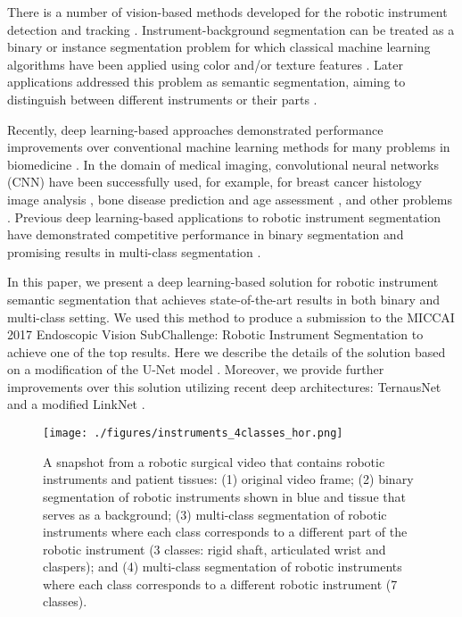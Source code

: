 \documentclass[runningheads,a4paper]{llncs}[2015/06/24]
\begin{document}
There is a number of vision-based methods developed for the robotic instrument detection and tracking \cite{munzer2018content}. Instrument-background segmentation can be treated as a binary or instance segmentation problem for which classical machine learning algorithms have been applied using color and/or texture features  \cite{speidel2006tracking, doignon2007segmentation}. Later applications addressed this problem as semantic segmentation, aiming to distinguish between different instruments or their parts \cite{pezzementi2009articulated, bouget2015detecting}.

Recently, deep learning-based approaches demonstrated performance improvements over conventional machine learning methods for many problems in biomedicine \cite{ching2017opportunities, kalinin2018deep}. In the domain of medical imaging, convolutional neural networks (CNN) have been successfully used, for example, for breast cancer histology image analysis \cite{rakhlin2018deep}, bone disease prediction \cite{tiulpin2018automatic} and age assessment \cite{iglovikov2017pediatric}, and other problems \cite{ching2017opportunities}. Previous deep learning-based applications to robotic instrument segmentation have demonstrated competitive performance in binary segmentation \cite{garcia2017toolnet, attia2017surgical} and promising results in multi-class segmentation \cite{pakhomov2017deep}.

In this paper, we present a deep learning-based solution for robotic instrument semantic segmentation that achieves state-of-the-art results in both binary and multi-class setting. We used this method to produce a submission to the MICCAI 2017 Endoscopic Vision SubChallenge: Robotic Instrument Segmentation \cite{miccai2017} to achieve one of the top results. Here we describe the details of the solution based on a modification of the U-Net model \cite{ronneberger2015u, iglovikov2017satellite}. Moreover, we provide further improvements over this solution utilizing recent deep architectures: TernausNet \cite{iglovikov2018ternausnet} and a modified LinkNet \cite{chaurasia2017linknet}.

\begin{figure}[!t]
\centering
\texttt{[image: ./figures/instruments\_4classes\_hor.png]}
\caption{A snapshot from a robotic surgical video that contains robotic instruments and patient tissues: (1) original video frame; (2) binary segmentation of robotic instruments shown in blue and tissue that serves as a background; (3) multi-class segmentation of robotic instruments where each class corresponds to a different part of the robotic instrument (3 classes: rigid shaft, articulated wrist and claspers); and (4) multi-class segmentation of robotic instruments where each class corresponds to a different robotic instrument (7 classes).}
\label{fig::classes}
\end{figure}
\end{document}
